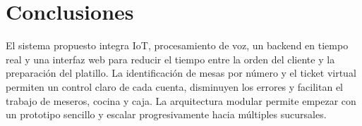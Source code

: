 \documentclass[11pt,letterpaper]{article}
\begin{document}
\section{Conclusiones}
El sistema propuesto integra IoT, procesamiento de voz, un backend en tiempo real y una interfaz web para reducir el tiempo entre la orden del cliente y la preparación del platillo. La identificación de mesas por número y el ticket virtual permiten un control claro de cada cuenta, disminuyen los errores y facilitan el trabajo de meseros, cocina y caja. La arquitectura modular permite empezar con un prototipo sencillo y escalar progresivamente hacia múltiples sucursales.
\end{document}
